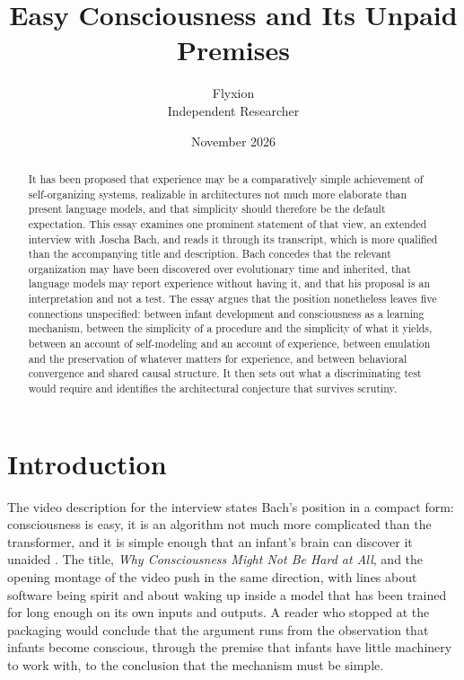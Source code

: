 \documentclass[11pt]{article}
\title{Easy Consciousness and Its Unpaid Premises}
\author{Flyxion\\Independent Researcher}
\date{November 2026}
\begin{document}
\maketitle

\begin{abstract}
\noindent It has been proposed that experience may be a comparatively simple achievement of self-organizing systems, realizable in architectures not much more elaborate than present language models, and that simplicity should therefore be the default expectation. This essay examines one prominent statement of that view, an extended interview with Joscha Bach, and reads it through its transcript, which is more qualified than the accompanying title and description. Bach concedes that the relevant organization may have been discovered over evolutionary time and inherited, that language models may report experience without having it, and that his proposal is an interpretation and not a test. The essay argues that the position nonetheless leaves five connections unspecified: between infant development and consciousness as a learning mechanism, between the simplicity of a procedure and the simplicity of what it yields, between an account of self-modeling and an account of experience, between emulation and the preservation of whatever matters for experience, and between behavioral convergence and shared causal structure. It then sets out what a discriminating test would require and identifies the architectural conjecture that survives scrutiny.
\end{abstract}

\newpage

\section{Introduction}

The video description for the interview states Bach's position in a compact form: consciousness is easy, it is an algorithm not much more complicated than the transformer, and it is simple enough that an infant's brain can discover it unaided \cite{mlst2026}. The title, \emph{Why Consciousness Might Not Be Hard at All}, and the opening montage of the video push in the same direction, with lines about software being spirit and about waking up inside a model that has been trained for long enough on its own inputs and outputs. A reader who stopped at the packaging would conclude that the argument runs from the observation that infants become conscious, through the premise that infants have little machinery to work with, to the conclusion that the mechanism must be simple.
\end{document}
